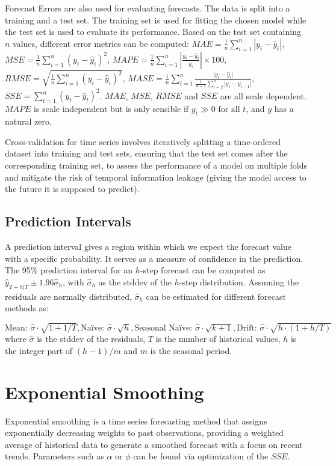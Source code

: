 \documentclass[10pt, a4paper]{article}
\begin{document}
Forecast Errors are also used for evaluating forecasts. The data is split into a training and a test set.
The training set is used for fitting the chosen model while the test set is used to evaluate its performance.
Based on the test set containing $ n $ values, different error metrics can be computed:
$ MAE = \frac{1}{n} \sum_{i=1}^{n} |y_i - \hat{y}_i| $,
$ MSE = \frac{1}{n} \sum_{i=1}^{n} (y_i - \hat{y}_i)^2 $,
$ MAPE = \frac{1}{n} \sum_{i=1}^{n} \left| \frac{y_i - \hat{y}_i}{y_i} \right| \times 100 $,
$ RMSE = \sqrt{\frac{1}{n} \sum_{i=1}^{n} (y_i - \hat{y}_i)^2} $,
$ MASE = \frac{1}{n} \sum_{i=1}^{n} \frac{|y_i - \hat{y}_i|}{\frac{1}{n-1} \sum_{i=2}^{n} |y_i - y_{i-1}|} $,
$ SSE = \sum_{t=1}^{n} (y_t - \hat{y}_t)^2 $.
$ MAE $, $ MSE $, $ RMSE $ and $ SSE $ are all scale dependent.
$ MAPE $ is scale independent but is only sensible if $ y_t \gg 0 \text{ for all } t $, and $ y $ has a natural zero.

Cross-validation for time series involves iteratively splitting a time-ordered dataset into training and test sets,
ensuring that the test set comes after the corresponding training set,
to assess the performance of a model on multiple folds and mitigate the risk of temporal information leakage
(giving the model access to the future it is supposed to predict).

\subsection{Prediction Intervals}
A prediction interval gives a region within which we expect the forecast value with a specific probability.
It serves as a measure of confidence in the prediction. The 95\% prediction interval for an $ h $-step forecast can be computed
as $ \hat{y}_{T+h|T} \pm 1.96 \hat{\sigma}_h $, with $ \hat{\sigma}_h $ as the stddev of the $ h $-step distribution.
Assuming the residuals are normally distributed, $ \hat{\sigma}_h $ can be estimated for different forecast methods as:

$ \text{Mean: } \hat{\sigma} \cdot \sqrt{1+1/T}, \text{Naïve: } \hat{\sigma} \cdot \sqrt{h},
\text{Seasonal Naïve: } \hat{\sigma} \cdot \sqrt{k+1}, \text{Drift: } \hat{\sigma} \cdot \sqrt{h \cdot (1+h/T)} $
where $ \hat{\sigma} $ is the stddev of the residuals, $ T $ is the number of historical values, $ h $ is the integer part of $ (h-1)/m $ and $ m $ is the seasonal period.

\section{Exponential Smoothing}
Exponential smoothing is a time series forecasting method that assigns exponentially decreasing weights to past observations,
providing a weighted average of historical data to generate a smoothed forecast with a focus on recent trends.
Parameters such as $ \alpha $ or $ \phi $ can be found via optimization of the $ SSE $.
\end{document}
